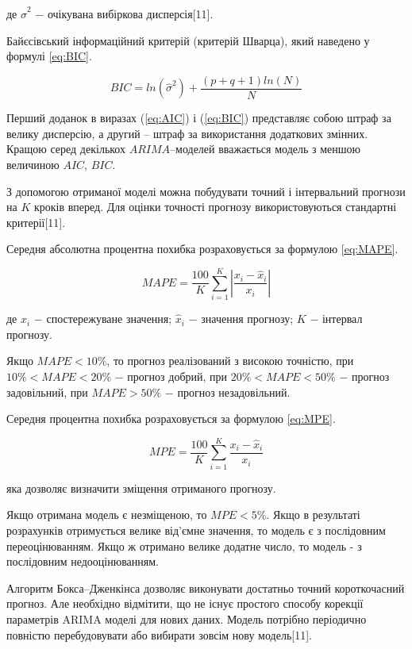 \noindent де $\hat{\sigma}^{2}$ $-$ очікувана вибіркова дисперсія[11]. 

Байєсівський інформаційний критерій (критерій Шварца), який наведено у формулі \ref{eq:BIC}. 

\begin{equation}\label{eq:BIC}
BIC = ln(\hat{\sigma}^{2}) + \frac{(p+q+1)ln(N)}{N}
\end{equation}

Перший доданок в виразах (\ref{eq:AIC}) і (\ref{eq:BIC}) представляє собою штраф за велику дисперсію, а другий – штраф за використання додаткових змінних. Кращою серед декількох $ARIMA$–моделей вважається модель з меншою величиною $AIC$, $BIC$.

З допомогою отриманої моделі можна побудувати точний і інтервальний прогнози на $K$ кроків вперед. Для оцінки точності прогнозу використовуються стандартні критерії[11].

Середня абсолютна процентна похибка розраховується за формулою \ref{eq:MAPE}.

\begin{equation}\label{eq:MAPE}
MAPE = \frac{100}{K}\sum_{i=1}^{K}\left|\frac{x_{i} - \hat{x}_{i}}{x_{i}}\right|
\end{equation}

\noindent де $x_{i}$ $-$ спостережуване значення; $\hat{x}_{i}$ $-$ значення прогнозу; $K$ $-$ інтервал прогнозу. 

Якщо $MAPE < 10 \%$, то прогноз реалізований з високою точністю, при $10\%<MAPE<20\%$ $-$ прогноз добрий, при $20\%<MAPE<50\%$ $-$ прогноз задовільний, при $MAPE>50\%$ $-$ прогноз незадовільний.

Середня процентна похибка розраховується за формулою \ref{eq:MPE}.

\begin{equation}\label{eq:MPE}
MPE = \frac{100}{K}\sum_{i=1}^{K}\frac{x_{i} - \hat{x}_{i}}{x_{i}}
\end{equation}

\noindent яка дозволяє визначити зміщення отриманого прогнозу. 

Якщо отримана модель є незміщеною, то $MPE < 5\%$. Якщо в результаті розрахунків отримується велике від’ємне значення, то модель є з послідовним переоцінюванням. Якщо ж отримано велике додатне число, то модель - з послідовним недооцінюванням. 

Алгоритм Бокса–Дженкінса дозволяє виконувати достатньо точний короткочасний прогноз. Але необхідно відмітити, що не існує простого способу корекції параметрів ARIMA моделі для нових даних. Модель потрібно періодично повністю перебудовувати або вибирати зовсім нову модель[11]. 


